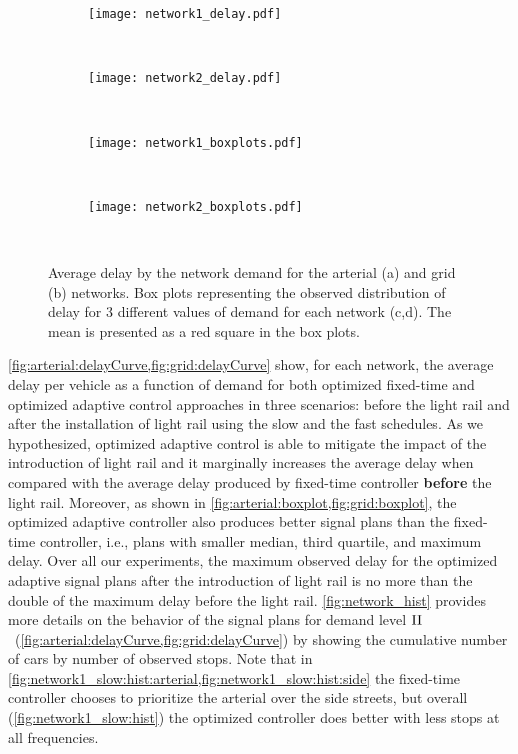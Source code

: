 \begin{figure*}[t]
%
\centering
\begin{subfigure}{0.49\textwidth}
\texttt{[image: network1\_delay.pdf]}
\caption{~}\label{fig:arterial:delayCurve}
\end{subfigure}
\begin{subfigure}{0.49\textwidth}
\texttt{[image: network2\_delay.pdf]}
\caption{~}\label{fig:grid:delayCurve}
\end{subfigure}
\begin{subfigure}{0.49\textwidth}
\texttt{[image: network1\_boxplots.pdf]}
\caption{~}\label{fig:arterial:boxplot}
\end{subfigure}
\begin{subfigure}{0.49\textwidth}
\texttt{[image: network2\_boxplots.pdf]}
\caption{~}\label{fig:grid:boxplot}
\end{subfigure}
%
\caption{Average delay by the network demand for the arterial (a) and grid (b)
networks. Box plots representing the observed distribution of delay for 3
different values of demand for each network (c,d). The mean is presented as a
red square in the box plots.}
%
\label{fig:delayCurveAndBoxplot}
%
\end{figure*}


\cref{fig:arterial:delayCurve,fig:grid:delayCurve} show, for each network, the
average delay per vehicle as a function of demand for both optimized fixed-time and
optimized adaptive control approaches in three scenarios: before the light rail and after
the installation of light rail using the slow and the fast schedules.
%
As we hypothesized, optimized adaptive control is able to mitigate the impact of
the introduction of light rail and it marginally increases the average delay
when compared with the average delay produced by fixed-time controller
\textbf{before} the light rail.
%
Moreover, as shown in \cref{fig:arterial:boxplot,fig:grid:boxplot}, the
optimized adaptive controller also produces better signal plans than the
fixed-time controller, i.e., plans with smaller median, third quartile, and
maximum delay.
%
Over all our experiments, the maximum observed delay for the optimized adaptive
signal plans after the introduction of light rail is no more than
%
%
the double of the maximum delay before the light rail.
%
\cref{fig:network_hist} provides more details on the behavior of the signal
plans for demand level $\rm II$~(\cref{fig:arterial:delayCurve,fig:grid:delayCurve}) by showing the
cumulative number of cars by number of observed stops.
%
Note that in \cref{fig:network1_slow:hist:arterial,fig:network1_slow:hist:side}
the fixed-time controller chooses to prioritize the arterial over the side
streets, but overall (\cref{fig:network1_slow:hist}) the optimized controller
does better with less stops at all frequencies.


